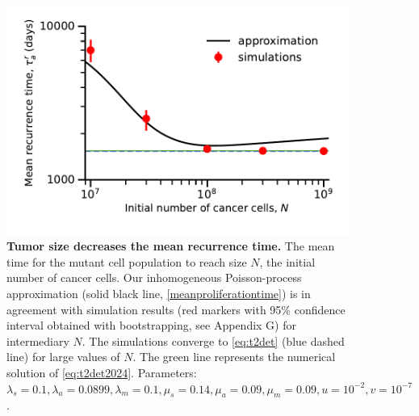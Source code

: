\documentclass[12pt]{extarticle}
\begin{document}
\begin{figure}
\vspace*{1\baselineskip}
\includegraphics[width=1\textwidth]{Figures/ProliferationTime.pdf}
\caption{\textbf{Tumor size decreases the mean recurrence time.}
The mean time for the mutant cell population to reach size $N$, the initial number of cancer cells.
Our inhomogeneous Poisson-process approximation (solid black line, \cref{meanproliferationtime}) is in agreement with simulation results (red markers with 95\% confidence interval obtained with bootstrapping, see Appendix G) for intermediary $N$. The simulations converge to \cref{eq:t2det} (blue dashed line) for large values of $N$. The green line represents the numerical solution of \cref{eq:t2det2024}. %
Parameters: $\lambda_s=0.1,\lambda_a=0.0899,\lambda_m=0.1,\mu_s=0.14,\mu_a=0.09,\mu_m=0.09, u=10^{-2}, v=10^{-7}$.}
\label{proliferationFigure}
\end{figure}



\newpage 
\end{document}

